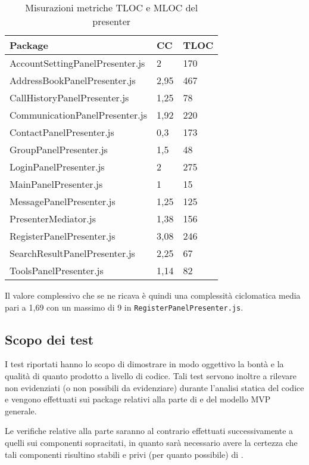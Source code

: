 \begin{table}[H]
\centering
{}
\begin{tabular}{p{}ll}
\toprule Package & CC  & TLOC\\
\midrule
AccountSettingPanelPresenter.js & 2 & 170\\
AddressBookPanelPresenter.js & 2,95 & 467\\
CallHistoryPanelPresenter.js & 1,25 & 78\\
CommunicationPanelPresenter.js & 1,92 & 220\\
ContactPanelPresenter.js & 0,3 & 173\\
GroupPanelPresenter.js & 1,5 & 48\\
LoginPanelPresenter.js & 2 & 275\\
MainPanelPresenter.js & 1 & 15\\
MessagePanelPresenter.js & 1,25 & 125\\
PresenterMediator.js & 1,38 & 156\\
RegisterPanelPresenter.js & 3,08 & 246\\
SearchResultPanelPresenter.js & 2,25 & 67\\
ToolsPanelPresenter.js & 1,14 & 82\\
\bottomrule
\end{tabular}
\caption{Misurazioni metriche TLOC e MLOC del presenter} \label{tab: metricheTLOCMLOCpresenter}
\end{table}
Il valore complessivo che se ne ricava è quindi una complessità ciclomatica media pari a 1,69 con un massimo di 9 in \texttt{RegisterPanelPresenter.js}.


\subsection{Scopo dei test}
I test riportati hanno lo scopo di dimostrare in modo oggettivo la bontà e la qualità di quanto prodotto a livello di codice. Tali test servono inoltre a rilevare  non evidenziati (o non possibili da evidenziare) durante l'analisi statica del codice e vengono effettuati sui package relativi alla parte di  e  del modello MVP generale.

Le verifiche relative alla parte  saranno al contrario effettuati successivamente a quelli sui componenti sopracitati, in quanto sarà necessario avere la certezza che tali componenti risultino stabili e privi (per quanto possibile) di .


